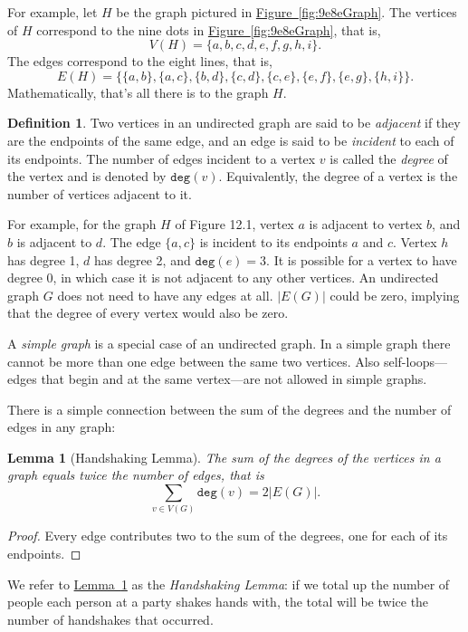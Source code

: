 \documentclass[11pt,oneside]{book}
\newtheorem{lem}[thm]{Lemma}
\theoremstyle{definition}
\newtheorem{defn}[thm]{Definition}
\begin{document}
For example, let $H$ be the graph pictured in \hyperref[fig:9e8eGraph]{Figure~\ref*{fig:9e8eGraph}}.
The vertices of $H$ correspond to the nine dots in \hyperref[fig:9e8eGraph]{Figure~\ref*{fig:9e8eGraph}}, that is,
\[ V(H) = \{ a, b, c, d, e, f, g, h, i \}. \]
The edges correspond to the eight lines, that is,
\[ E(H) = \{ \{ a, b \}, \{ a, c \}, \{ b, d \}, \{ c, d \}, \{c, e \}, \{ e, f \}, \{ e, g \}, \{ h, i \} \}. \]
Mathematically, that's all there is to the graph $H$.

\begin{defn}
  Two vertices in an undirected graph are said to be \emph{adjacent} if they are the endpoints of the same edge, and an edge is said to be \emph{incident} to each of its endpoints.
  The number of edges incident to a vertex $v$ is called the \emph{degree} of the vertex and is denoted by $\texttt{deg}(v)$. Equivalently, the degree of a vertex is the number of vertices adjacent to it.
\end{defn}

For example, for the graph $H$ of Figure 12.1, vertex $a$ is adjacent to vertex $b$, and $b$ is adjacent to $d$.
The edge $\{ a, c \}$ is incident to its endpoints $a$ and $c$.
Vertex $h$ has degree 1, $d$ has degree 2, and $\texttt{deg}(e) = 3$.
It is possible for a vertex to have degree 0, in which case it is not adjacent to any other vertices.
An undirected graph $G$ does not need to have any edges at all.
$|E(G)|$ could be zero, implying that the degree of every vertex would also be zero.

A \emph{simple graph} is a special case of an undirected graph.
In a simple graph there cannot be more than one edge between the same two vertices.
Also self-loops---edges that begin and at the same vertex---are
not allowed in simple graphs.

There is a simple connection between the sum of the degrees and the number of edges in any graph:
\begin{lem}[Handshaking Lemma] \label{lem:handshakingLemma}
  The sum of the degrees of the vertices in a graph equals twice the number of edges, that is
  \[ \sum_{v \in V(G)} \texttt{deg}(v) = 2|E(G)|. \]
\end{lem}
\begin{proof}
  Every edge contributes two to the sum of the degrees, one for each of its endpoints.
\end{proof}

We refer to \hyperref[lem:handshakingLemma]{Lemma~\ref*{lem:handshakingLemma}} as the \emph{Handshaking Lemma}: if we total up the number of people each person at a party shakes hands with, the total will be twice the number of handshakes that occurred.
\end{document}
